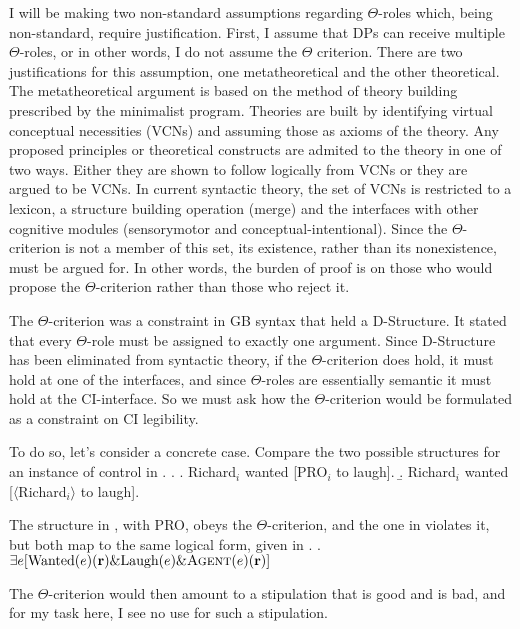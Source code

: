 \documentclass[letterpaper,12pt]{article}
\begin{document}
I will be making two non-standard assumptions regarding $\Theta$-roles which, being non-standard, require justification.
First, I assume that DPs can receive multiple $\Theta$-roles, or in other words, I do not assume the $\Theta$ criterion.
There are two justifications for this assumption, one metatheoretical and the other theoretical.
The metatheoretical argument is based on the method of theory building prescribed by the minimalist program.
Theories are built by identifying virtual conceptual necessities (VCNs) and assuming those as axioms of the theory.
Any proposed principles or theoretical constructs are admited to the theory in one of two ways.
Either they are shown to follow logically from VCNs or they are argued to be VCNs.
In current syntactic theory, the set of VCNs is restricted to a lexicon, a structure building operation (merge) and the interfaces with other cognitive modules (sensorymotor and conceptual-intentional).
Since the $\Theta$-criterion is not a member of this set, its existence, rather than its nonexistence, must be argued for.
In other words, the burden of proof is on those who would propose the $\Theta$-criterion rather than those who reject it.

The $\Theta$-criterion was a constraint in GB syntax that held a D-Structure. 
It stated that every $\Theta$-role must be assigned to exactly one argument.
Since D-Structure has been eliminated from syntactic theory, if the $\Theta$-criterion does hold, it must hold at one of the interfaces, and since $\Theta$-roles are essentially semantic it must hold at the CI-interface.
So we must ask how the $\Theta$-criterion would be formulated as a constraint on CI legibility.

To do so, let's consider a concrete case.
Compare the two possible structures for an instance of control in \Next.
\ex.
\a. Richard$_i$ wanted [PRO$_i$ to laugh].
\b. Richard$_i$ wanted [$\langle$Richard$_i\rangle$ to laugh].

The structure in \Last[a], with PRO, obeys the $\Theta$-criterion, and the one in \Last[b] violates it, but both map to the same logical form, given in \Next.
\ex. $\exists e [\text{Wanted}(e)(\textbf{r}) \& \text{Laugh}(e) \& \textsc{Agent}(e)(\textbf{r})]$

The $\Theta$-criterion would then amount to a stipulation that \LLast[a] is good and \LLast[b] is bad, and for my task here, I see no use for such a stipulation.
\end{document}
